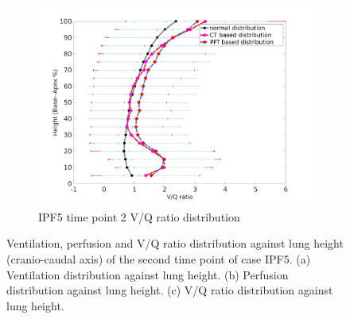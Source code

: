 \begin{figure}[htbp]
\begin{subfigure}{.6\linewidth}
  \includegraphics[width=\linewidth,trim={{.0\wd0} {.0\wd0} {.0\wd0} {.0\wd0}},clip]{Appendix/Image_AppexB/IPF501/IPF501_VQAgainstLungHeight.png}
  \caption{IPF5 time point 2 V/Q ratio distribution}
  \label{fig:IPF501VQDistribution-c}
\end{subfigure}
\caption{ Ventilation, perfusion and V/Q ratio distribution against lung height (cranio-caudal axis) of the second time point of case IPF5. (a) Ventilation distribution against lung height. (b) Perfusion distribution against lung height. (c) V/Q ratio distribution against lung height.}
\label{fig:IPF501VQDistribution}
\end{figure}

